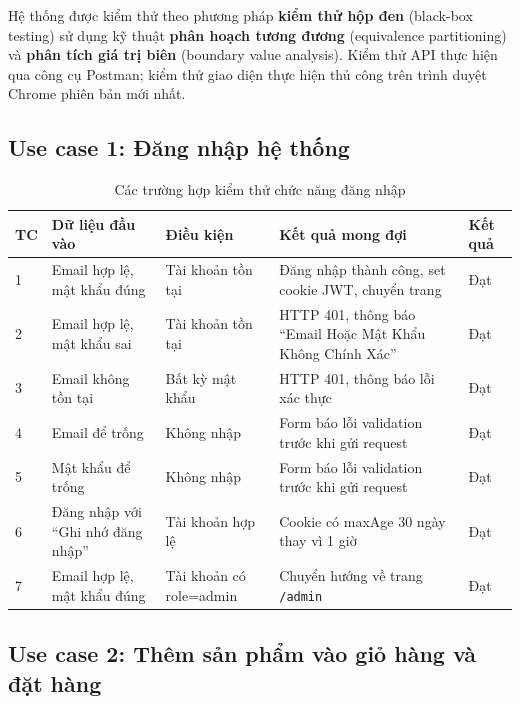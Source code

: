 \documentclass[../DoAn.tex]{subfiles}
\begin{document}
Hệ thống được kiểm thử theo phương pháp \textbf{kiểm thử hộp đen} (black-box
testing) sử dụng kỹ thuật \textbf{phân hoạch tương đương} (equivalence
partitioning) và \textbf{phân tích giá trị biên} (boundary value analysis).
Kiểm thử API thực hiện qua công cụ Postman; kiểm thử giao diện thực hiện thủ
công trên trình duyệt Chrome phiên bản mới nhất.

\subsection*{Use case 1: Đăng nhập hệ thống}

\begin{table}[H]
\centering
\caption{Các trường hợp kiểm thử chức năng đăng nhập}
\label{tab:test-login}
\scriptsize
\begin{tabular}{|p{0.5cm}|p{3.5cm}|p{3cm}|p{3.5cm}|p{2cm}|}
\hline
\textbf{TC} & \textbf{Dữ liệu đầu vào} & \textbf{Điều kiện} & \textbf{Kết quả mong đợi} & \textbf{Kết quả} \\
\hline
1 & Email hợp lệ, mật khẩu đúng & Tài khoản tồn tại & Đăng nhập thành công, set cookie JWT, chuyển trang & Đạt \\
\hline
2 & Email hợp lệ, mật khẩu sai & Tài khoản tồn tại & HTTP 401, thông báo ``Email Hoặc Mật Khẩu Không Chính Xác'' & Đạt \\
\hline
3 & Email không tồn tại & Bất kỳ mật khẩu & HTTP 401, thông báo lỗi xác thực & Đạt \\
\hline
4 & Email để trống & Không nhập & Form báo lỗi validation trước khi gửi request & Đạt \\
\hline
5 & Mật khẩu để trống & Không nhập & Form báo lỗi validation trước khi gửi request & Đạt \\
\hline
6 & Đăng nhập với ``Ghi nhớ đăng nhập'' & Tài khoản hợp lệ & Cookie có maxAge 30 ngày thay vì 1 giờ & Đạt \\
\hline
7 & Email hợp lệ, mật khẩu đúng & Tài khoản có role=admin & Chuyển hướng về trang \texttt{/admin} & Đạt \\
\hline
\end{tabular}
\end{table}

\subsection*{Use case 2: Thêm sản phẩm vào giỏ hàng và đặt hàng}
\end{document}
